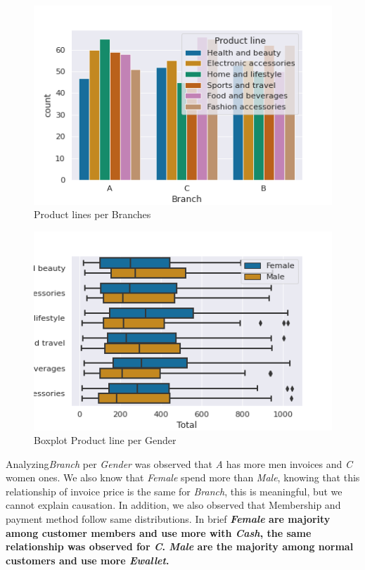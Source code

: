 \documentclass[11pt, a4]{article}
\begin{document}
\begin{figure}[!h]
\includegraphics[]{branch_line}
\centering
\caption{Product lines per Branches}
\label{fig:prodb}
\end{figure}

\begin{figure}[!h]
\includegraphics[]{boxgender}
\centering
\caption{Boxplot Product line per Gender}
\label{fig:bgedner}
\end{figure}

Analyzing\textit{Branch} per \textit{Gender} was observed that \textit{A} has more men invoices and \textit{C} women ones. We also know that \textit{Female} spend more than \textit{Male}, knowing that this relationship of invoice price is the same for \textit{Branch}, this is meaningful, but we cannot explain causation. In addition, we also observed that Membership and payment method follow same distributions. In brief \textbf{\textit{Female} are majority among customer members and use more with \textit{Cash}, the same relationship was observed for \textit{C}. \textit{Male} are the majority among normal customers and use more \textit{Ewallet}.}
\end{document}
